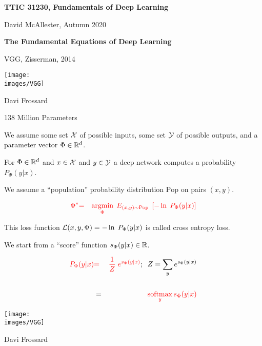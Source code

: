 




{\Huge
  \centerline{\bf TTIC 31230,  Fundamentals of Deep Learning}
  \vfill
  \centerline{David McAllester, Autumn 2020}
  \vfill
  \centerline{\bf The Fundamental Equations of Deep Learning}

{VGG, Zisserman, 2014}

\centerline{\texttt{[image: \\images/VGG]}}
\centerline{\large Davi Frossard}

\vfill
\centerline{{\color{red} 138 Million Parameters}}


{\color{red} We assume some set ${\cal X}$ of possible inputs, some set ${\cal Y}$ of possible outputs,
and a parameter vector $\Phi \in \mathbb{R}^d$.}

\vfill
For $\Phi \in \mathbb{R}^d$ and $x \in {\cal X}$ and $y \in {\cal Y}$ a deep network computes a probability {\color{red} $P_\Phi(y|x)$}.


We assume a ``population'' probability distribution $\mathrm{Pop}$ on pairs $(x,y)$.

\vfill
\begin{eqnarray*}
{\color{red} \Phi^*} & {\color{red}  =} & {\color{red} \operatorname*{argmin}_\Phi \;E_{(x,y) \sim \mathrm{Pop}}\; \left[-\ln \;P_\Phi(y|x)\right]}
\end{eqnarray*}

\vfill
This loss function {\color{red} ${\cal L}(x,y,\Phi) = - \ln \;P_\Phi(y|x)$} is called {\color{red} cross entropy loss}.


We start from a ``score'' function $s_\Phi(y|x) \in \mathbb{R}$.

\vfill
\begin{eqnarray*}
  {\color{red} P_\Phi(y|x)} & {\color{red} =} & {\color{red} \frac{1}{Z}\;e^{s_\Phi(y|x)}};\;\; Z = \sum_y e^{s_\Phi(y|x)} \\
  \\
  & = & {\color{red} \operatorname*{softmax}_y s_\Phi(y|x)}
\end{eqnarray*}


\centerline{\texttt{[image: \\images/VGG]}}
\centerline{\large Davi Frossard}

}
